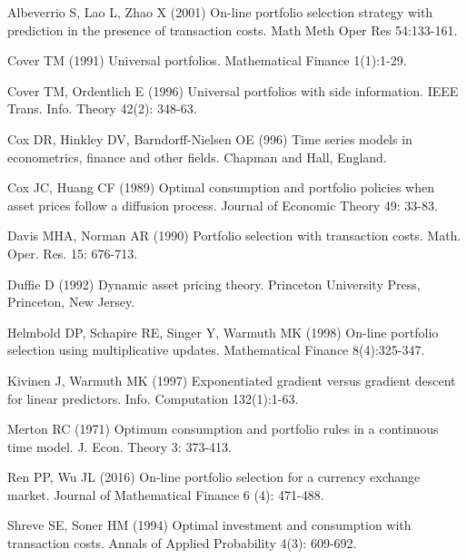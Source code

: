 \documentclass[11pt]{article}
\numberwithin{equation}{section}
\begin{document}
\begin{thebibliography}{17}
 Albeverrio S, Lao L, Zhao X (2001) On-line portfolio selection strategy with prediction in the presence of transaction costs. Math Meth Oper Res 54:133-161. 

 Cover TM (1991) Universal portfolios. Mathematical Finance 1(1):1-29.

 Cover TM, Ordentlich E (1996) Universal portfolios with side information. IEEE Trans. Info. Theory 42(2): 348-63.

 Cox DR, Hinkley DV, Barndorff-Nielsen OE (996) Time series models in econometrics, finance and other fields. Chapman and Hall, England.   

 Cox JC, Huang CF (1989) Optimal consumption and portfolio policies when asset prices follow a diffusion process. Journal of Economic Theory 49: 33-83.

 Davis MHA, Norman AR (1990) Portfolio selection with transaction costs. Math. Oper. Res. 15: 676-713. 

 Duffie D (1992) Dynamic asset pricing theory. Princeton University Press, Princeton, New Jersey.

 Helmbold DP, Schapire RE, Singer Y, Warmuth MK (1998) On-line portfolio selection using 
multiplicative updates. Mathematical Finance 8(4):325-347.

 Kivinen J, Warmuth MK (1997)  Exponentiated gradient versus gradient descent for linear
predictors. Info. Computation 132(1):1-63.  

 Merton RC (1971) Optimum consumption and portfolio rules in a continuous time model. J. Econ. Theory 3: 373-413.

 Ren PP, Wu JL (2016) On-line portfolio selection for a currency exchange market. Journal of Mathematical Finance 6 (4): 471-488. 

 Shreve SE, Soner HM (1994) Optimal investment and consumption with transaction costs.
Annals of Applied Probability 4(3): 609-692.

\end{thebibliography}
\end{document}
